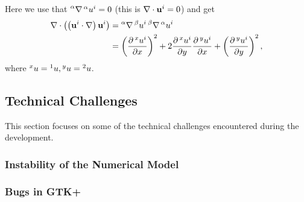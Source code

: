 \documentclass{article}
\begin{document}
Here we use that $\prescript{\alpha}{}\nabla\prescript{\alpha}{} u^i=0$ (this is $\nabla\cdot\mathbf u^i=0$) and get
\begin{align}
	\nabla\cdot\left(\left(\mathbf u^i\cdot\nabla\right)\mathbf u^i\right)&=\prescript{\alpha}{}\nabla\prescript{\beta}{} u^i\prescript{\beta}{}\nabla\prescript{\alpha}{} u^i\\
	&=\left(\frac{\partial \prescript{x}{}u^i}{\partial x}\right)^2+2\frac{\partial \prescript{x}{}u^i}{\partial y}\frac{\partial \prescript{y}{}u^i}{\partial x}+\left(\frac{\partial \prescript{y}{}u^i}{\partial y}\right)^2,
\end{align}
where $\prescript{x}{}u=\prescript{1}{}u,\prescript{y}{}u=\prescript{2}{}u$.


\subsection{Technical Challenges}
This section focuses on some of the technical challenges encountered during the development.
\subsubsection{Instability of the Numerical Model}
\subsubsection{Bugs in GTK+}
\end{document}
